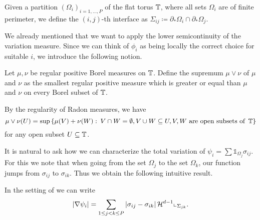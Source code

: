 \begin{definition}
	Given a partition $ \left( \Omega_{ i } \right)_{ i = 1 , \dotsc , P } $ of 
	the flat torus $ \operatorname{\mathbb{T}} $, where all sets $ \Omega_{ i } $ are of 
	finite perimeter, we define the $ (i,j)$-th interface as $ \Sigma_{ i j } 
	\coloneqq \partial_{ \ast } \Omega_{ i } \cap \partial_{ \ast } \Omega_{ j 
	} $.
\end{definition}

We already mentioned that we want to apply the lower semicontinuity of the variation measure. Since we can think of $ \phi_{ i } $ as being locally the correct choice for suitable $ i $, we introduce the following notion.

\begin{definition}
	Let $ \mu , \nu $ be regular positive Borel measures on $ \operatorname{\mathbb{T}} $. 
	Define the supremum $ \mu \vee \nu $ of $ \mu $ and $ \nu $ as the smallest 
	regular positive measure which is greater or equal than $ \mu $ and $ \nu $ 
	on every Borel subset of $ \operatorname{\mathbb{T}} $. 
\end{definition}

\begin{remark}
By the regularity of Radon 
	measures, we have
	\begin{equation*}
		\mu \vee \nu ( U ) 
		=
		\sup \left\{
			\mu ( V ) + \nu ( W )
			\, \colon \,
			V \cap W = \emptyset,
			V \cup W \subseteq U, 
			V,W \text{ are open subsets of } \operatorname{\mathbb{T}}
		\right\}
	\end{equation*}	for any open subset $ U \subseteq \operatorname{\mathbb{T}} $.
\end{remark}

It is natural to ask how we can characterize the total variation of $ \psi_{ i 
} = \sum \mathds{ 1 }_{ \Omega_{ j } } \sigma_{ i j } $. 
For this we note that when going from the set $ \Omega_{ j } $ to the set $ 
\Omega_{ k } $, 
our function jumps from $ \sigma_{ i j } $ to $ \sigma_{ i k } $. Thus we 
obtain the following intuitive result.

\begin{lemma}
	\label{rewriting_variation_of_psi_i}
	In the setting of  we can write
	\begin{equation*}
		\abs{ \nabla \psi_{ i } }
		=
		\sum_{ 1 \leq j < k \leq P }
			\abs{ \sigma_{ i j } - \sigma_{ i k } }
			\operatorname{\mathcal{H}}^{ d - 1 } \llcorner_{ \Sigma_{ j k } } .
	\end{equation*}
\end{lemma}

